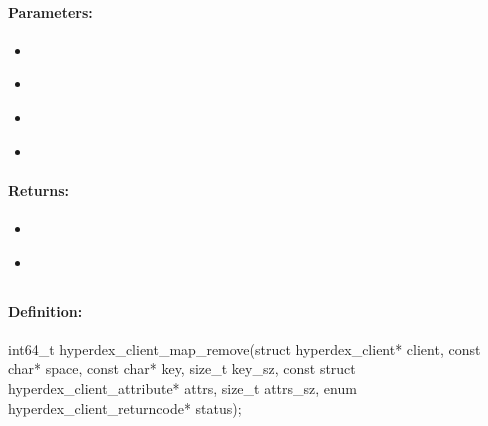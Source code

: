 \paragraph{Parameters:}
\begin{itemize}[noitemsep]
\item {}\\

\item {}\\

\item {}\\

\item {}\\

\end{itemize}

\paragraph{Returns:}
\begin{itemize}[noitemsep]
\item {}\\

\item {}\\

\end{itemize}

\pagebreak
\subsection{}
\label{api:c:map_remove}


\paragraph{Definition:}
\begin{ccode}
int64_t hyperdex_client_map_remove(struct hyperdex_client* client,
        const char* space,
        const char* key, size_t key_sz,
        const struct hyperdex_client_attribute* attrs, size_t attrs_sz,
        enum hyperdex_client_returncode* status);
\end{ccode}

